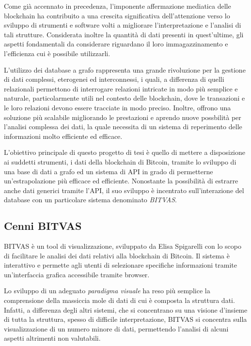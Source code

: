 
Come già accennato in precedenza, l'imponente affermazione mediatica delle blockchain ha contribuito a una crescita significativa dell'attenzione verso lo sviluppo di strumenti e software volti a migliorare l'interpretazione e l'analisi di tali strutture.
Considerata inoltre la quantità di dati presenti in quest'ultime, gli aspetti fondamentali da considerare riguardano il loro immagazzinamento e l'efficienza cui è possibile utilizzarli.

L'utilizzo dei database a grafo rappresenta una grande rivoluzione per la gestione di dati complessi, eterogenei ed interconnessi, i quali, a differenza di quelli relazionali permettono di interrogare relazioni intricate in modo più semplice e naturale, particolarmente utili nel contesto delle blockchain, dove le transazioni e le loro relazioni devono essere tracciate in modo preciso. Inoltre, offrono una soluzione più scalabile migliorando le prestazioni e aprendo nuove possbilità per l'analisi complessa dei dati, la quale necessita di un sistema di reperimento delle informazioni molto efficiente ed efficace.

L'obiettivo principale di questo progetto di tesi è quello di mettere a disposizione ai suddetti strumenti, i dati della blockchain di Bitcoin, tramite lo sviluppo di una base di dati a grafo ed un sistema di API in grado di permetterne un'estrapolazione più efficace ed efficiente.
Nonostante la possibilità di estrarre anche dati generici tramite l'API, il suo sviluppo è incentrato sull'interazione del database con un particolare sistema denominato \textit{BITVAS}.



\subsection{Cenni BITVAS}

BITVAS \cite{TesiBITVAS} è un tool di visualizzazione, sviluppato da Elisa Spigarelli con lo scopo di facilitare le analisi dei dati relativi alla blockchain di Bitcoin.
Il sistema è interattivo e permette agli utenti di selezionare specifiche informazioni tramite un'interfaccia grafica accessibile tramite browser.

Lo sviluppo di un adeguato \emph{paradigma visuale} ha reso più semplice la comprensione della  massiccia mole di dati di cui è composta la struttura dati.
Infatti, a differenza degli altri sistemi, che si concentrano su una visione d'insieme di tutta la struttura, spesso di difficile interpretazione, BITVAS si concentra sulla visualizzazione di un numero minore di dati, permettendo l'analisi di alcuni aspetti altrimenti non valutabili.

